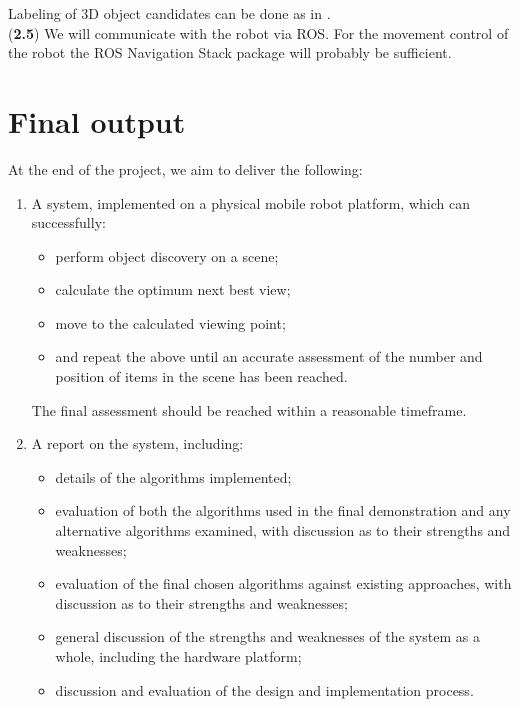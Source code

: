 \documentclass[a4paper,11pt,english]{article}
\begin{document}
Labeling of 3D object candidates can be done as in \cite{garcia2013computational}.\\
(\textbf{2.5}) We will communicate with the robot via ROS.
For the movement control of the robot the ROS Navigation Stack package will probably be sufficient.

\section{Final output}\label{finaloutput}

At the end of the project, we aim to deliver the following:

\begin{enumerate}
	
	\item A system, implemented on a physical mobile robot platform, which can successfully:
	\begin{itemize}
		\item perform object discovery on a scene;
		\item calculate the optimum next best view;
		\item move to the calculated viewing point;
		\item and repeat the above until an accurate assessment of the number and position of items in the scene has been reached.
	\end{itemize}
	The final assessment should be reached within a reasonable timeframe.

	\item A report on the system, including:
	\begin{itemize}
		\item details of the algorithms implemented;
		\item evaluation of both the algorithms used in the final demonstration and any alternative algorithms examined, with discussion as to their strengths and weaknesses;
		\item evaluation of the final chosen algorithms against existing approaches, with discussion as to their strengths and weaknesses;
		\item general discussion of the strengths and weaknesses of the system as a whole, including the hardware platform;
		\item discussion and evaluation of the design and implementation process.
	\end{itemize}

\end{enumerate}


\newpage


\end{document}
